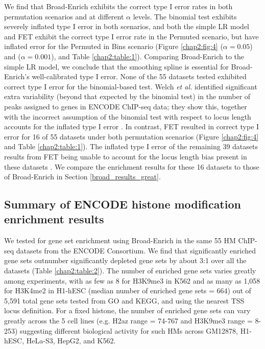 We find that Broad-Enrich exhibits the correct type I error rates in both permutation scenarios and at different $\alpha$ levels. The binomial test exhibits severely inflated type I error in both scenarios, and both the simple LR model and FET exhibit the correct type I error rate in the Permuted scenario, but have inflated error for the Permuted in Bins scenario (Figure \ref{chap2:fig:4} ($\alpha = 0.05$) and ($\alpha = 0.001$), and Table \ref{chap2:table:1}). Comparing Broad-Enrich to the simple LR model, we conclude that the smoothing spline is essential for Broad-Enrich’s well-calibrated type I error. None of the 55 datasets tested exhibited correct type I error for the binomial-based test. Welch \emph{et al.} identified significant extra variability (beyond that expected by the binomial test) in the number of peaks assigned to genes in ENCODE ChIP-seq data; they show this, together with the incorrect assumption of the binomial test with respect to locus length  accounts for the inflated type I error \cite{Welch:2014fb}. In contrast, FET resulted in correct type I error for 16 of 55 datasets under both permutation scenarios (Figure \ref{chap2:fig:4} and Table \ref{chap2:table:1}). The inflated type I error of the remaining 39 datasets results from FET being unable to account for the locus length bias present in these datasets \cite{Welch:2014fb, Taher:2009ko}. We compare the enrichment results for these 16 datasets to those of Broad-Enrich in Section \ref{broad_results_great}.

\subsection{Summary of ENCODE histone modification enrichment results}
\label{broadenrich_results_encode}

We tested for gene set enrichment using Broad-Enrich in the same 55 HM ChIP-seq datasets from the ENCODE Consortium. We find that significantly enriched gene sets outnumber significantly depleted gene sets by about 3:1 over all the datasets (Table \ref{chap2:table:2}). The number of enriched gene sets varies greatly among experiments, with as few as 8 for H3K9me3 in K562 and as many as 1,058 for H3K4me2 in H1-hESC (median number of enriched gene sets = 664) out of 5,591 total gene sets tested from GO and KEGG, and using the nearest TSS locus definition. For a fixed histone, the number of enriched gene sets can vary greatly across the 5 cell lines (e.g. H2az range = 74-767 and H3K9me3 range = 8-253) suggesting different biological activity for such HMs across GM12878, H1-hESC, HeLa-S3, HepG2, and K562.

